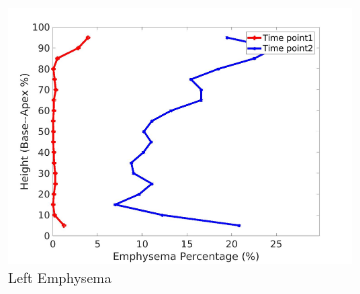 \begin{figure}[H]
\begin{subfigure}{.42\linewidth}
  \includegraphics[width=\linewidth,trim={{.0\wd0} {.0\wd0} {.0\wd0} {.0\wd0}},clip]{Appendix/Image_AppexA/BaseToApex/IPF13LeftLungEmphysemaDiseaseAgainstHeight.jpg} %
  \caption{Left Emphysema}
  \label{fig:IPF13DiseaseAgainstHeight-g} 
\end{subfigure} 
\begin{subfigure}{.42\linewidth}%

\end{subfigure}
\end{figure}
